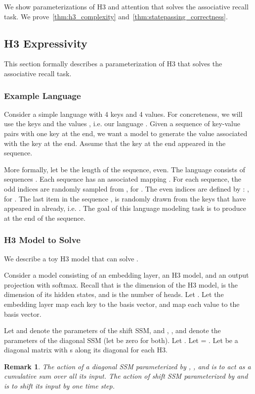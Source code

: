 \documentclass{article}
\newtheorem*{remark}{Remark}
\newcommand{\hthree}{\textsc{H3}\xspace}
\begin{document}
We show parameterizations of \hthree and attention that solves the associative recall task.
We prove~\cref{thm:h3_complexity} and~\cref{thm:statepassing_correctness}.

\subsection{\hthree Expressivity}
\label{sec:app_expressivity}

This section formally describes a parameterization of \hthree that solves the associative recall task.

\subsubsection{Example Language }
Consider a simple language with 4 keys and 4 values.
For concreteness, we will use the keys  and the values , i.e. our language .
Given a sequence of key-value pairs with one key at the end, we want a model to generate the value associated with the key at the end.
Assume that the key at the end appeared in the sequence.

More formally, let  be the length of the sequence,  even.
The language  consists of sequences .
Each sequence has an associated mapping .
For each sequence, the odd indices are randomly sampled from , for .
The even indices are defined by : , for .
The last item in the sequence , is randomly drawn from the keys that have appeared in  already, i.e. .
The goal of this language modeling task is to produce  at the end of the sequence.

\subsubsection{H3 Model to Solve }
We describe a toy \hthree model that can solve .

Consider a model consisting of an embedding layer, an \hthree model, and an output projection with softmax.
Recall that  is the dimension of the \hthree model,  is the dimension of its hidden states, and  is the number of heads.
Let .
Let the embedding layer map each key  to the  basis vector, and map each value  to the  basis vector.

Let  and  denote the parameters of the shift SSM, and , , and  denote the parameters of the diagonal SSM (let  be zero for both).
Let .
Let  = .
Let  be a diagonal matrix with s along its diagonal for each \hthree.

\begin{remark}
The action of a diagonal SSM parameterized by , , and  is to act as a cumulative sum over all its input.
The action of shift SSM parameterized by  and  is to shift its input by one time step.
\end{remark}
\end{document}
